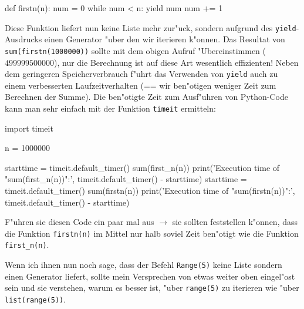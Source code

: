 \documentclass{article}
\begin{document}
\begin{python}
def firstn(n):
    num = 0
    while num < n:
        yield num
        num += 1
\end{python}
Diese Funktion liefert nun keine Liste mehr zur"uck, sondern aufgrund des \verb+yield+-Ausdrucks einen Generator "uber den wir iterieren k"onnen. Das Resultat von \verb+sum(firstn(1000000))+ sollte mit dem obigen Aufruf "Ubereinstimmen ($499999500000$), nur die Berechnung ist auf diese Art wesentlich effizienten!
Neben dem geringeren Speicherverbrauch f"uhrt das Verwenden von \verb+yield+ auch zu einem verbesserten Laufzeitverhalten (== wir ben"otigen weniger Zeit zum Berechnen der Summe). Die ben"otigte Zeit zum Ausf"uhren von Python-Code kann man sehr einfach mit der Funktion \verb+timeit+ ermitteln:
\begin{python}
import timeit

n = 1000000

starttime = timeit.default_timer()
sum(first_n(n))
print('Execution time of "sum(first_n(n))":', timeit.default_timer() - starttime)
starttime = timeit.default_timer()
sum(firstn(n))
print('Execution time of "sum(firstn(n))":', timeit.default_timer() - starttime)
\end{python}
F"uhren sie diesen Code \glqq ein paar mal\grqq{} aus $\rightarrow$ sie sollten feststellen k"onnen, dass die Funktion \verb+firstn(n)+ im Mittel nur halb soviel Zeit ben"otigt wie die Funktion \verb+first_n(n)+.

Wenn ich ihnen nun noch sage, dass der Befehl \verb+Range(5)+ keine Liste sondern einen Generator liefert, sollte mein \glqq Versprechen\grqq{} von etwas weiter oben eingel"ost sein und sie verstehen, warum es besser ist, "uber \verb+range(5)+ zu iterieren wie "uber \verb+list(range(5))+.
\end{document}
